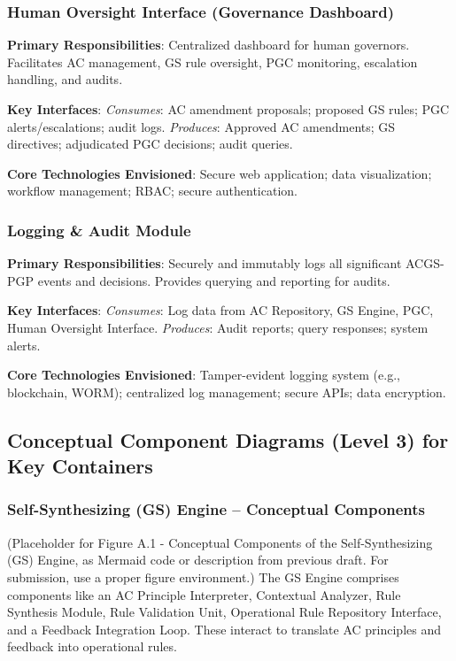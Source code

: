 \documentclass[sigconf,review,anonymous=false]{acmart} %
\begin{document}
\subsubsection{Human Oversight Interface (Governance Dashboard)}
\label{app:architecture_details_ho_interface}
\textbf{Primary Responsibilities}: Centralized dashboard for human governors. Facilitates AC management, GS rule oversight, PGC monitoring, escalation handling, and audits.

\textbf{Key Interfaces}:
    \textit{Consumes}: AC amendment proposals; proposed GS rules; PGC alerts/escalations; audit logs.
    \textit{Produces}: Approved AC amendments; GS directives; adjudicated PGC decisions; audit queries.

\textbf{Core Technologies Envisioned}: Secure web application; data visualization; workflow management; RBAC; secure authentication.

\subsubsection{Logging \& Audit Module}
\label{app:architecture_details_log_audit}
\textbf{Primary Responsibilities}: Securely and immutably logs all significant ACGS-PGP events and decisions. Provides querying and reporting for audits.

\textbf{Key Interfaces}:
    \textit{Consumes}: Log data from AC Repository, GS Engine, PGC, Human Oversight Interface.
    \textit{Produces}: Audit reports; query responses; system alerts.

\textbf{Core Technologies Envisioned}: Tamper-evident logging system (e.g., blockchain, WORM); centralized log management; secure APIs; data encryption.


\subsection{Conceptual Component Diagrams (Level 3) for Key Containers}
\label{app:architecture_details_components}
\subsubsection{Self-Synthesizing (GS) Engine – Conceptual Components}
\label{app:architecture_details_gs_components}
(Placeholder for Figure A.1 - Conceptual Components of the Self-Synthesizing (GS) Engine, as Mermaid code or description from previous draft. For submission, use a proper figure environment.)
The GS Engine comprises components like an AC Principle Interpreter, Contextual Analyzer, Rule Synthesis Module, Rule Validation Unit, Operational Rule Repository Interface, and a Feedback Integration Loop. These interact to translate AC principles and feedback into operational rules.
\end{document}
